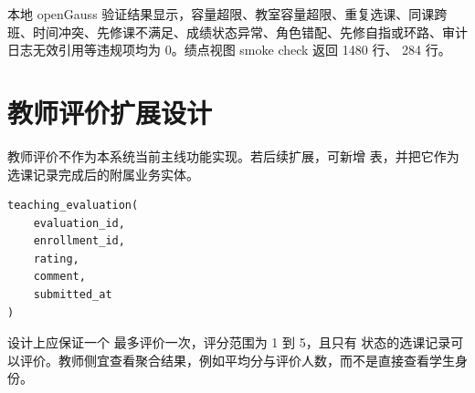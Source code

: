 本地 openGauss 验证结果显示，容量超限、教室容量超限、重复选课、同课跨班、时间冲突、先修课不满足、成绩状态异常、角色错配、先修自指或环路、审计日志无效引用等违规项均为 0。绩点视图 smoke check 返回  1480 行、 284 行。

\section{教师评价扩展设计}

教师评价不作为本系统当前主线功能实现。若后续扩展，可新增  表，并把它作为选课记录完成后的附属业务实体。

\begin{lstlisting}[style=sqlstyle]
teaching_evaluation(
    evaluation_id,
    enrollment_id,
    rating,
    comment,
    submitted_at
)
\end{lstlisting}

设计上应保证一个  最多评价一次，评分范围为 1 到 5，且只有  状态的选课记录可以评价。教师侧宜查看聚合结果，例如平均分与评价人数，而不是直接查看学生身份。
